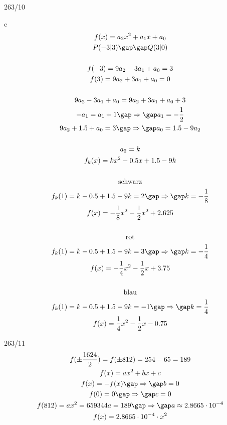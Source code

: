 \begin{exercise}{263/10}
  \item [c]
  \begin{gather*}
    f(x) = a_2x^2 + a_1x + a_0 \\
    P(-3|3) \gap\gap Q(3|0) \\\\
    f(-3) = 9a_2 - 3a_1 + a_0 = 3 \\
    f(3) = 9a_2 + 3a_1 + a_0 = 0 \\\\
    9a_2 - 3a_1 + a_0 = 9a_2 + 3a_1 + a_0 + 3 \\
    -a_1 = a_1 + 1 \gap\Rightarrow\gap a_1 = -\frac{1}{2} \\
    9a_2 + 1.5 + a_0 = 3 \gap\Rightarrow\gap a_0 = 1.5 - 9a_2 \\\\
    a_2 = k \\
    f_k(x) = kx^2 - 0.5x + 1.5 - 9k \\\\
    \text{schwarz} \\
    f_k(1) = k - 0.5 + 1.5 - 9k = 2 \gap\Rightarrow\gap k = -\frac{1}{8} \\
    f(x) = -\frac{1}{8}x^2 - \frac{1}{2}x^2 + 2.625 \\\\
    \text{rot} \\
    f_k(1) = k - 0.5 + 1.5 - 9k = 3 \gap\Rightarrow\gap k = -\frac{1}{4} \\
    f(x) = -\frac{1}{4}x^2 - \frac{1}{2}x + 3.75 \\\\
    \text{blau} \\
    f_k(1) = k - 0.5 + 1.5 - 9k = -1 \gap\Rightarrow\gap k = \frac{1}{4} \\
    f(x) = \frac{1}{4}x^2 - \frac{1}{2}x - 0.75
  \end{gather*}
\end{exercise}
\begin{exercise}{263/11}
  \begin{gather*}
    f(\pm\frac{1624}{2}) = f(\pm812) = 254 - 65 = 189 \\
    f(x) = ax^2 + bx + c \\
    f(x) = -f(x) \gap\Rightarrow\gap b = 0 \\
    f(0) = 0 \gap\Rightarrow\gap c = 0 \\
    f(812) = ax^2 = 659344a = 189 \gap\Rightarrow\gap a \approx 2.8665 \cdot 10^{-4} \\
    f(x) = 2.8665 \cdot 10^{-4} \cdot x^2
  \end{gather*}
\end{exercise}
